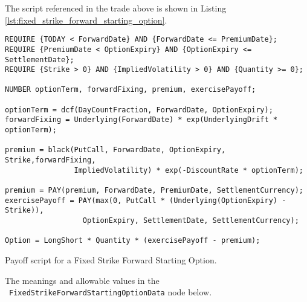 The script referenced in the trade above is shown in Listing \ref{lst:fixed_strike_forward_starting_option}.
 
\begin{listing}[hbt] 
\begin{verbatim} 
REQUIRE {TODAY < ForwardDate} AND {ForwardDate <= PremiumDate};
REQUIRE {PremiumDate < OptionExpiry} AND {OptionExpiry <= SettlementDate};
REQUIRE {Strike > 0} AND {ImpliedVolatility > 0} AND {Quantity >= 0};

NUMBER optionTerm, forwardFixing, premium, exercisePayoff;

optionTerm = dcf(DayCountFraction, ForwardDate, OptionExpiry);
forwardFixing = Underlying(ForwardDate) * exp(UnderlyingDrift * optionTerm);

premium = black(PutCall, ForwardDate, OptionExpiry, Strike,forwardFixing,
                ImpliedVolatility) * exp(-DiscountRate * optionTerm);

premium = PAY(premium, ForwardDate, PremiumDate, SettlementCurrency);
exercisePayoff = PAY(max(0, PutCall * (Underlying(OptionExpiry) - Strike)),
                  OptionExpiry, SettlementDate, SettlementCurrency);

Option = LongShort * Quantity * (exercisePayoff - premium);
\end{verbatim} 
\caption{Payoff script for a Fixed Strike Forward Starting Option.} 
\label{lst:fixed_strike_forward_starting_option} 
\end{listing} 
 
The meanings and allowable values in the \
\lstinline!FixedStrikeForwardStartingOptionData! node below.
 
